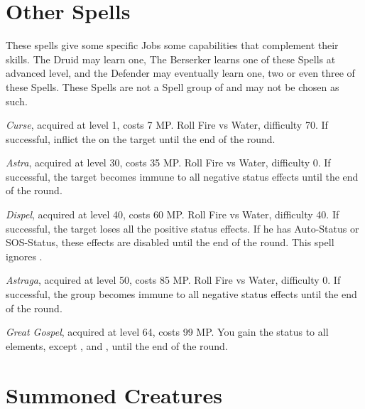 \section{Other Spells}\label{sec:magic-other}
\begin{multicols}{2}

    These spells give some specific Jobs some capabilities that complement their skills. The Druid may learn one, The Berserker learns one of these Spells at advanced level, and the Defender may eventually learn one, two or even three of these Spells. These Spells are not a Spell group of and may not be chosen as such.
    
    \textit{Curse}, acquired at level 1, costs 7 MP\@. Roll Fire vs Water, difficulty 70. If successful, inflict the  on the target until the end of the round.

    \textit{Astra}, acquired at level 30, costs 35 MP\@. Roll Fire vs Water, difficulty 0. If successful, the target becomes immune to all negative status effects until the end of the round.
    
    \textit{Dispel}, acquired at level 40, costs 60 MP\@. Roll Fire vs Water, difficulty 40. If successful, the target loses all the positive status effects. If he has Auto-Status or SOS-Status, these effects are disabled until the end of the round. This spell ignores .
    
    \textit{Astraga}, acquired at level 50, costs 85 MP\@. Roll Fire vs Water, difficulty 0. If successful, the group becomes immune to all negative status effects until the end of the round.
    
    \textit{Great Gospel}, acquired at level 64, costs 99 MP\@. You gain the  status to all elements, except ,  and , until the end of the round.	

\end{multicols}

\section{Summoned Creatures}\label{sec:magic-summoned}

